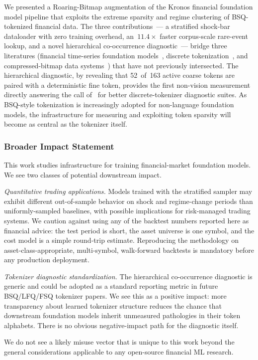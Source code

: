 \documentclass[10pt]{article}
\begin{document}
We presented a Roaring-Bitmap augmentation of the Kronos financial
foundation model pipeline that exploits the extreme sparsity and
regime clustering of BSQ-tokenized financial data. The three
contributions~--- a stratified shock-bar dataloader with zero
training overhead, an~$11.4\times$ faster corpus-scale rare-event
lookup, and a novel hierarchical co-occurrence diagnostic~--- bridge
three literatures (financial time-series foundation
models~\citep{kronos2025}, discrete tokenization~\citep{bsq2024,
fsq2024, lfq2024}, and compressed-bitmap data
systems~\citep{roaring2016}) that have not previously
intersected. The hierarchical diagnostic, by revealing that 52~of~163
active coarse tokens are paired with a deterministic fine token,
provides the first non-vision measurement directly answering the
call of~\citet{shrinks_codebook2026} for better discrete-tokenizer
diagnostic suites. As BSQ-style tokenization is increasingly adopted
for non-language foundation models, the infrastructure for measuring
and exploiting token sparsity will become as central as the
tokenizer itself.

\subsubsection*{Broader Impact Statement}

This work studies infrastructure for training financial-market
foundation models. We see two classes of potential downstream
impact.

\emph{Quantitative trading applications.} Models trained with the
stratified sampler may exhibit different out-of-sample behavior
on shock and regime-change periods than uniformly-sampled
baselines, with possible implications for risk-managed trading
systems. We caution against using any of the backtest numbers
reported here as financial advice: the test period is short, the
asset universe is one symbol, and the cost model is a simple
round-trip estimate. Reproducing the methodology on
asset-class-appropriate, multi-symbol, walk-forward backtests is
mandatory before any production deployment.

\emph{Tokenizer diagnostic standardization.} The hierarchical
co-occurrence diagnostic is generic and could be adopted as a
standard reporting metric in future BSQ/LFQ/FSQ tokenizer papers.
We see this as a positive impact: more transparency about learned
tokenizer structure reduces the chance that downstream foundation
models inherit unmeasured pathologies in their token alphabets.
There is no obvious negative-impact path for the diagnostic itself.

We do not see a likely misuse vector that is unique to this work
beyond the general considerations applicable to any open-source
financial ML research.



\end{document}
